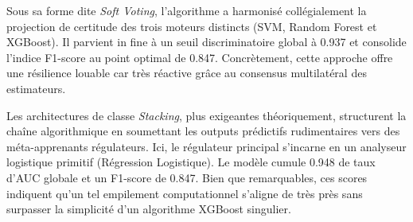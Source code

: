 Sous sa forme dite \textit{Soft Voting}, l'algorithme a harmonisé collégialement la projection de certitude des trois moteurs distincts (SVM, Random Forest et XGBoost). Il parvient in fine à un seuil discriminatoire global à 0.937 et consolide l'indice F1-score au point optimal de 0.847. Concrètement, cette approche offre une résilience louable car très réactive grâce au consensus multilatéral des estimateurs.

Les architectures de classe \textit{Stacking}, plus exigeantes théoriquement, structurent la chaîne algorithmique en soumettant les outputs prédictifs rudimentaires vers des méta-apprenants régulateurs. 
Ici, le régulateur principal s'incarne en un analyseur logistique primitif (Régression Logistique). Le modèle cumule 0.948 de taux d'AUC globale et un F1-score de 0.847. Bien que remarquables, ces scores indiquent qu'un tel empilement computationnel s'aligne de très près sans surpasser la simplicité d'un algorithme XGBoost singulier.
